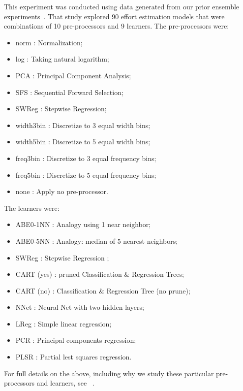 \documentclass{sig-alternate}
\newcommand{\bi}{\begin{itemize}}
\newcommand{\ei}{\end{itemize}}
\begin{document}
This  experiment was  conducted using data generated
from our prior ensemble experiments~\cite{me11a}. That study explored  90 effort estimation models
that were
combinations of 10 pre-processors and
9 learners. The pre-processors were:
\bi
\item norm : Normalization;
\item log : Taking natural logarithm;
\item PCA : Principal Component Analysis;
\item SFS : Sequential Forward Selection;
\item SWReg : Stepwise Regression;
\item width3bin : Discretize to 3 equal width bins;
\item width5bin : Discretize to 5 equal width bins;
\item freq3bin : Discretize to 3 equal frequency bins;
\item freq5bin : Discretize to 5 equal frequency bins;
\item none : Apply no pre-processor.
\ei
The learners were:
\bi
\item   ABE0-1NN : Analogy using 1 near neighbor;
\item   ABE0-5NN : Analogy: median of 5 nearest neighbors;
\item    SWReg : Stepwise Regression ;
\item CART (yes) : pruned Classification \& Regression Trees; 
\item  CART (no) : Classification \& Regression Tree (no prune);
\item  NNet : Neural Net with two hidden layers;
\item LReg : Simple linear regression;
\item PCR : Principal components regression;
\item PLSR : Partial lest squares regression.
\ei
For full details on the above, including
why we study these particular pre-processors and learners, see ~\cite{me11a}.
\end{document}

